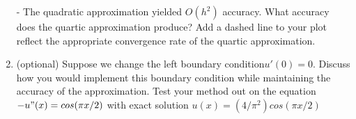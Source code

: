\documentclass[14pt,a4paper]{article}
\begin{document}
\begin{enumerate}
	- The quadratic approximation yielded $O(h^2)$ accuracy. What accuracy does the quartic approximation produce? Add a dashed line to your plot reflect the appropriate convergence rate of the quartic approximation.\\
	
	\label{1g}
	\item (optional) Suppose we change the left boundary condition$u'(0) = 0$. Discuss how you would implement this boundary condition while maintaining the accuracy of the approximation. Test your method out on the equation $-u"(x) = cos(\pi x/2)$ with exact solution  $u(x) = (4/\pi^2) cos(\pi x/2)$\\
	
	
	
	
\end{enumerate}
\end{document}

